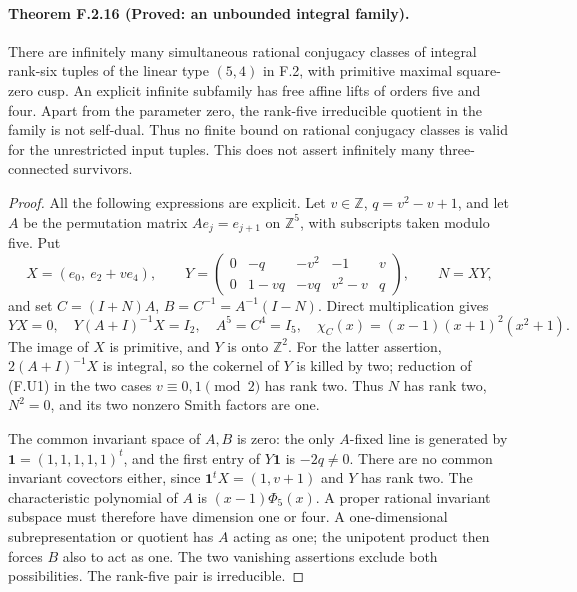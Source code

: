 \paragraph{Theorem F.2.16 (Proved: an unbounded integral family).}
There are infinitely many simultaneous rational conjugacy classes
of integral rank-six tuples of the linear type $(5,4)$ in F.2,
with primitive maximal square-zero cusp.  An explicit infinite
subfamily has free affine lifts of orders five and four.
Apart from the parameter zero, the rank-five irreducible quotient
in the family is not self-dual.  Thus no finite bound on rational
conjugacy classes is valid for the unrestricted input tuples.
This does not assert infinitely many three-connected survivors.

\begin{proof}
All the following expressions are explicit.  Let $v\in\mathbb Z$,
$q=v^2-v+1$, and let $A$ be the permutation matrix
$Ae_j=e_{j+1}$ on $\mathbb Z^5$, with subscripts taken modulo five.
Put
\[
 X=(e_0,\ e_2+ve_4),\qquad
 Y=\begin{pmatrix}
 0&-q&-v^2&-1&v\\
 0&1-vq&-vq&v^2-v&q
 \end{pmatrix},\qquad N=XY,
 \tag{F.U1}
\]
and set $C=(I+N)A$, $B=C^{-1}=A^{-1}(I-N)$.
Direct multiplication gives
\[
 YX=0,\quad Y(A+I)^{-1}X=I_2,\quad
 A^5=C^4=I_5,\quad
 \chi_C(x)=(x-1)(x+1)^2(x^2+1).
 \tag{F.U2}
\]
The image of $X$ is primitive, and $Y$ is onto $\mathbb Z^2$.
For the latter assertion, $2(A+I)^{-1}X$ is integral, so the
cokernel of $Y$ is killed by two; reduction of (F.U1) in the
two cases $v\equiv0,1\pmod2$ has rank two.  Thus $N$ has
rank two, $N^2=0$, and its two nonzero Smith factors are one.

The common invariant space of $A,B$ is zero: the only
$A$-fixed line is generated by $\mathbf1=(1,1,1,1,1)^t$,
and the first entry of $Y\mathbf1$ is $-2q\ne0$.
There are no common invariant covectors either, since
$\mathbf1^tX=(1,v+1)$ and $Y$ has rank two.
The characteristic polynomial of $A$ is $(x-1)\Phi_5(x)$.
A proper rational invariant subspace must therefore have
dimension one or four.  A one-dimensional subrepresentation
or quotient has $A$ acting as one; the unipotent product then
forces $B$ also to act as one.  The two vanishing assertions
exclude both possibilities.  The rank-five pair is irreducible.


\end{proof}
